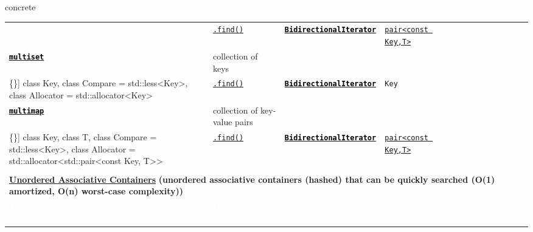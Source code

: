 \documentclass{beamer}
\newcommand\ccode[1]{\textcolor{black}{\texttt{\textbf{#1}}}}
\newcommand\hcode[1]{\textcolor{black}{\texttt{\textbf{#1}}}}
\newcommand\codel[1]{\texttt{#1}}
\newcommand\htblt[1]{\textcolor{purpleth}{\textbf{\Large{#1}}}}
\begin{document}
\begin{textblock}{65.2}
\begin{beamercolorbox}[sep=2mm,wd=65.2cm,rounded=true]{concrete}
\begin{tabular*}{\linewidth}{l  l  l  l  l  l}
\begin{minipage}{8.7in}
      \end{minipage} & \href{http://en.cppreference.com/w/cpp/container/map/find}{\codel{.find()}} & \href{http://en.cppreference.com/w/cpp/concept/BidirectionalIterator}{\ccode{BidirectionalIterator}} & \href{http://en.cppreference.com/w/cpp/utility/pair}{\codel{pair<const Key,T>}} \\
      \href{http://en.cppreference.com/w/cpp/container/multiset}{\hcode{multiset}} & collection of keys
      & \begin{minipage}{10.9in}
          \linespread{0.5}
          \begin{Verbatim}[commandchars=\\\{\}]
class Key, class Compare = std::less<Key>, class Allocator = std::allocator<Key>
            \end{Verbatim}
      \end{minipage} & \href{http://en.cppreference.com/w/cpp/container/multiset/find}{\codel{.find()}} & \href{http://en.cppreference.com/w/cpp/concept/BidirectionalIterator}{\ccode{BidirectionalIterator}} & \codel{Key} \\
      \rowcolor{white}
      \href{http://en.cppreference.com/w/cpp/container/multimap}{\hcode{multimap}} & collection of key-value pairs
      & \begin{minipage}{8.7in}
          \linespread{0.5}
          \begin{Verbatim}[commandchars=\\\{\}]
class Key, class T, class Compare = std::less<Key>,
class Allocator = std::allocator<std::pair<const Key, T>>
          \end{Verbatim}
        \end{minipage} & \href{http://en.cppreference.com/w/cpp/container/multimap/find}{\codel{.find()}} & \href{http://en.cppreference.com/w/cpp/concept/BidirectionalIterator}{\ccode{BidirectionalIterator}} & \href{http://en.cppreference.com/w/cpp/utility/pair}{\codel{pair<const Key,T>}} \\
      \multicolumn{6}{l}{} \\
      \multicolumn{6}{l}{\htblt{\href{http://en.cppreference.com/w/cpp/container}{Unordered Associative Containers}}\hspace*{1em} \textcolor{purpleth}{\large{\textbf{(unordered associative containers (hashed) that can be quickly searched (O(1) amortized, O(n) worst-case complexity))}}}} \\
      \cellcolor{purpleth}\textcolor{white}{\bfseries{Type}} & \cellcolor{purpleth}\textcolor{white}{\bfseries{Description}} & \cellcolor{purpleth}\textcolor{white}{\bfseries{Template Parameters}} & \cellcolor{purpleth}\textcolor{white}{\bfseries{Search}} & \cellcolor{purpleth}\textcolor{white}{\bfseries{Iterator Type}} & \cellcolor{purpleth}\textcolor{white}{\bfseries{Value Type}} \\

\end{tabular*}
\end{beamercolorbox}
\end{textblock}
\end{document}
